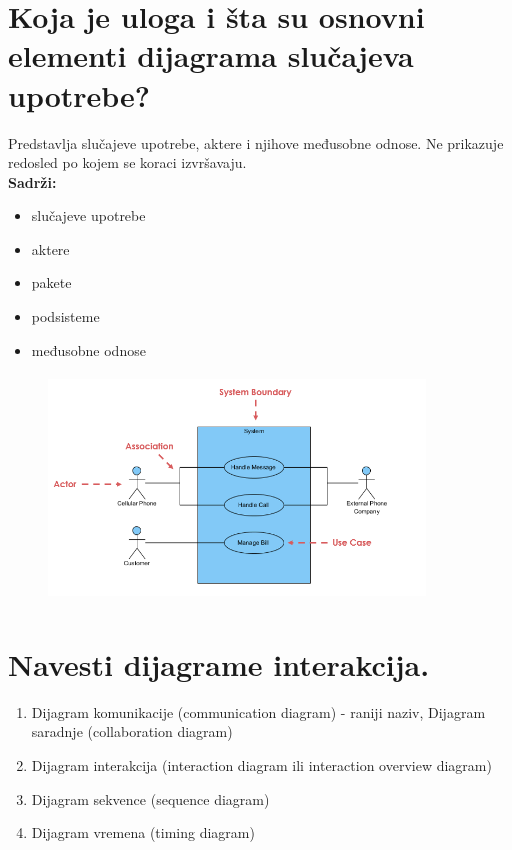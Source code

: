 \documentclass[a4paper]{article}
\begin{document}
\section{Koja je uloga i šta su osnovni elementi dijagrama slučajeva upotrebe?}
  Predstavlja slučajeve upotrebe, aktere i njihove međusobne odnose. Ne prikazuje redosled
  po kojem se koraci izvršavaju.\\
  \textbf{Sadrži:}
  \begin{itemize}
    \item slučajeve upotrebe
    \item aktere
    \item pakete
    \item podsisteme
    \item međusobne odnose
  \end{itemize}
  \begin{figure}[H]
    \begin{center}
        \includegraphics[width=100mm,height=60mm]{Slike/uml_slucaj_upotrebe.png}
    \end{center}
  \end{figure} 

\section{Navesti dijagrame interakcija.}
  \begin{enumerate}
    \item Dijagram komunikacije (communication diagram) 
          - raniji naziv, Dijagram saradnje (collaboration diagram)
    \item Dijagram interakcija (interaction diagram ili interaction overview diagram)
    \item Dijagram sekvence (sequence diagram)
    \item Dijagram vremena (timing diagram)
  \end{enumerate}
\end{document}

